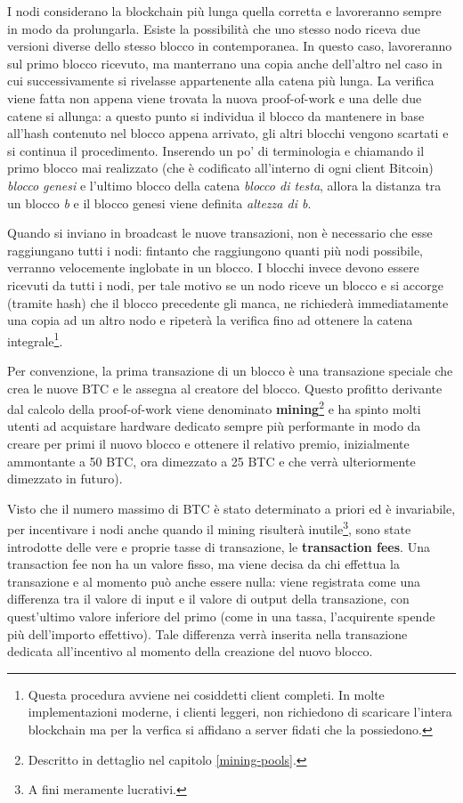 I nodi considerano la blockchain più lunga quella corretta e lavoreranno sempre in modo da prolungarla. Esiste la possibilità che uno stesso nodo riceva due versioni diverse dello stesso blocco in contemporanea. In questo caso, lavoreranno sul primo blocco ricevuto, ma manterrano una copia anche dell'altro nel caso in cui successivamente si rivelasse appartenente alla catena più lunga. La verifica viene fatta non appena viene trovata la nuova proof-of-work e una delle due catene si allunga: a questo punto si individua il blocco da mantenere in base all'hash contenuto nel blocco appena arrivato, gli altri blocchi vengono scartati e si continua il procedimento. Inserendo un po' di terminologia e chiamando il primo blocco mai realizzato (che è codificato all'interno di ogni client Bitcoin) \emph{blocco genesi} e l'ultimo blocco della catena \emph{blocco di testa}, allora la distanza tra un blocco \emph{b} e il blocco genesi viene definita \emph{altezza di b}.

Quando si inviano in broadcast le nuove transazioni, non è necessario che esse raggiungano tutti i nodi: fintanto che raggiungono quanti più nodi possibile, verranno velocemente inglobate in un blocco. I blocchi invece devono essere ricevuti da tutti i nodi, per tale motivo se un nodo riceve un blocco e si accorge (tramite hash) che il blocco precedente gli manca, ne richiederà immediatamente una copia ad un altro nodo e ripeterà la verifica fino ad ottenere la catena integrale\footnote{Questa procedura avviene nei cosiddetti client completi. In molte implementazioni moderne, i clienti leggeri, non richiedono di scaricare l'intera blockchain ma per la verfica si affidano a server fidati che la possiedono.}.

Per convenzione, la prima transazione di un blocco è una transazione speciale che crea le nuove BTC e le assegna al creatore del blocco. Questo profitto derivante dal calcolo della proof-of-work viene denominato \textbf{mining}\footnote{Descritto in dettaglio nel capitolo \ref{mining-pools}.} e ha spinto molti utenti ad acquistare hardware dedicato sempre più performante in modo da creare per primi il nuovo blocco e ottenere il relativo premio, inizialmente ammontante a 50 BTC, ora dimezzato a 25 BTC e che verrà ulteriormente dimezzato in futuro).

Visto che il numero massimo di BTC è stato determinato a priori ed è invariabile, per incentivare i nodi anche quando il mining risulterà inutile\footnote{A fini meramente lucrativi.}, sono state introdotte delle vere e proprie tasse di transazione, le \textbf{transaction fees}. Una transaction fee non ha un valore fisso, ma viene decisa da chi effettua la transazione e al momento può anche essere nulla: viene registrata come una differenza tra il valore di input e il valore di output della transazione, con quest'ultimo valore inferiore del primo (come in una tassa, l'acquirente spende più dell'importo effettivo). Tale differenza verrà inserita nella transazione dedicata all'incentivo al momento della creazione del nuovo blocco.

